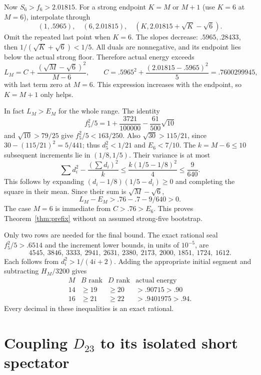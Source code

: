 \documentclass[11pt]{article}
\theoremstyle{remark}
\begin{document}
Now \(S_6>f_6>2.01815\). For a strong endpoint \(K=M\) or \(M+1\)
(use \(K=6\) at \(M=6\)), interpolate through
\[
 (1,.5965),\quad(6,2.01815),\quad
 (K,2.01815+\sqrt K-\sqrt6).
\]
Omit the repeated last point when \(K=6\).
The slopes decrease: \(.5965,.28433\), then
\(1/(\sqrt K+\sqrt6)<1/5\). All duals are nonnegative, and its
endpoint lies below the actual strong floor. Therefore actual
energy exceeds
\[
 L_M=C+\frac{(\sqrt M-\sqrt6)^2}{M-6},\qquad
 C=.5965^2+\frac{(2.01815-.5965)^2}{5}=.7600299945,
\]
with last term zero at \(M=6\). This expression increases with
the endpoint, so \(K=M+1\) only helps.

In fact \(L_M>E_M\) for the whole range. The identity
\[
 f_5^2/5=1+\frac{3721}{100000}-\frac{61}{500}\sqrt{10}
\]
and \(\sqrt{10}>79/25\) give \(f_5^2/5<163/250\).
Also \(\sqrt{30}>115/21\), since \(30-(115/21)^2=5/441\);
thus \(d_5^2<1/21\) and \(E_6<7/10\).
The \(k=M-6\le10\) subsequent increments lie in \((1/8,1/5)\).
Their variance is at most
\[
 \sum d_i^2-\frac{(\sum d_i)^2}{k}
 \le \frac{k(1/5-1/8)^2}{4}\le\frac9{640}.
\]
This follows by expanding
\((d_i-1/8)(1/5-d_i)\ge0\) and completing the square in their
mean. Since their sum is \(\sqrt M-\sqrt6\),
\[
 L_M-E_M>.76-.7-9/640>0.
\]
The case \(M=6\) is immediate from \(C>.76>E_6\).
This proves Theorem~\ref{thm:prefix} without an assumed strong-five
bootstrap.

Only two rows are needed for the final bound. The exact rational
seal \(f_5^2/5>.6514\) and the increment lower bounds, in units
of \(10^{-5}\), are
\[
 4545,\ 3846,\ 3333,\ 2941,\ 2631,\ 2380,\ 2173,\
 2000,\ 1851,\ 1724,\ 1612 .
\]
Each follows from \(d_i^2>1/(4i+2)\). Adding the appropriate
initial segment and subtracting \(H_M/3200\) gives
\begin{equation}\label{eq:prefixrows}
\begin{array}{c|c|c|c}
 M&B\text{ rank}&D\text{ rank}&\text{actual energy}\\ \hline
 14&\ge19&\ge20&>.90715>.90\\
 16&\ge21&\ge22&>.9401975>.94 .
\end{array}
\end{equation}
Every decimal in these inequalities is an exact rational.

\section{Coupling \texorpdfstring{\(D_{23}\)}{D23} to its isolated short spectator}
\label{sec:D23}
\end{document}
